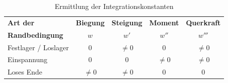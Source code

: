 \documentclass[a4paper,12pt]{article}
\begin{document}
\begin{table}[h!]
  \begin{center}
    \caption{Ermittlung der Integrationskonstanten}
    \label{tab:table2}
    \begin{tabular}{l|c|c|c|c} %
      \textbf{Art der} & \textbf{Biegung} & \textbf{Steigung} & \textbf{Moment} & \textbf{Querkraft}\\
      \textbf{Randbedingung} & $w$ & $w'$ & $w''$ & $w'''$\\
      \hline
      Festlager / Loslager & 0 & $\neq 0$ & 0 & $\neq 0$\\
      \hline
      Einspannung & 0 & 0 & $\neq 0$ & $\neq 0$\\
      \hline
      Loses Ende & $\neq 0$ & $\neq 0$ & 0 & 0\\
    \end{tabular}
  \end{center}
\end{table}
\pagebreak
\end{document}
